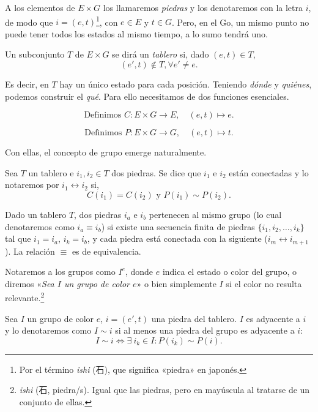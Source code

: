 A los elementos de $E \times G$ los llamaremos \textit{piedras} y los denotaremos con la letra $i$, de modo que $i=(e,t)$\footnote{Por el término \textit{ishi} (石), que significa «piedra» en japonés.}, con $e \in E$ y $t \in G$. Pero, en el Go, un mismo punto no puede tener todos los estados al mismo tiempo, a lo sumo tendrá uno.
\begin{definition}[Tablero]
	Un subconjunto $T$ de $E\times G$ se dirá un \textit{tablero} si, dado $(e,t)\in T$, $$(e',t)\notin T, \forall e' \neq e.$$
\end{definition}
Es decir, en $T$ hay un único estado para cada posición. Teniendo \textit{dónde} y \textit{quiénes}, podemos construir el \textit{qué}. Para ello necesitamos de dos funciones esenciales.
\begin{definition}\label{funcioncolor}
	\[\text{Definimos } C: E \times G \to E, \quad (e,t) \mapsto e.\]
\end{definition}
\begin{definition}\label{funcionposiciion}
	\[\text{Definimos } P: E \times G \to G, \quad (e,t) \mapsto t.\]
\end{definition}
Con ellas, el concepto de grupo emerge naturalmente.
\begin{definition}[Conexión]
	Sea $T$ un tablero e $i_1, i_2 \in T$ dos piedras. Se dice que $i_1$ e $i_2$ están conectadas y lo notaremos por $i_1 \leftrightarrow i_2$ si,
	\[C(i_1) = C(i_2) \text{ y } P(i_1) \sim P(i_2).\]
\end{definition}
\begin{definition}
	Dado un tablero $T$, dos piedras $i_a$ e $i_b$ pertenecen al mismo grupo (lo cual denotaremos como $i_a \equiv i_b$) si existe una secuencia finita de piedras $\{i_1, i_2, \dots, i_k\}$ tal que $i_1 = i_a$, $i_k = i_b$, y cada piedra está conectada con la siguiente ($i_m \leftrightarrow i_{m+1}$). La relación $\equiv$ es de equivalencia.
	
	Notaremos a los grupos como $I^e$, donde $e$ indica el estado o color del grupo, o diremos «\textit{Sea $I$ un grupo de color $e$}» o bien simplemente $I$ si el color no resulta relevante.\footnote{\textit{ishi} (石, piedra/s). Igual que las piedras, pero en mayúscula al tratarse de un conjunto de ellas.}
\end{definition}

\begin{definition}
	Sea $I$ un grupo de color $e$, $i=(e',t)$ una piedra del tablero. $I$ es adyacente a $i$ y lo denotaremos como $I \sim i$ si al menos una piedra del grupo es adyacente a $i$:
	\[I \sim i \iff \exists \ i_k \in I : P(i_k) \sim P(i).\]
\end{definition}

